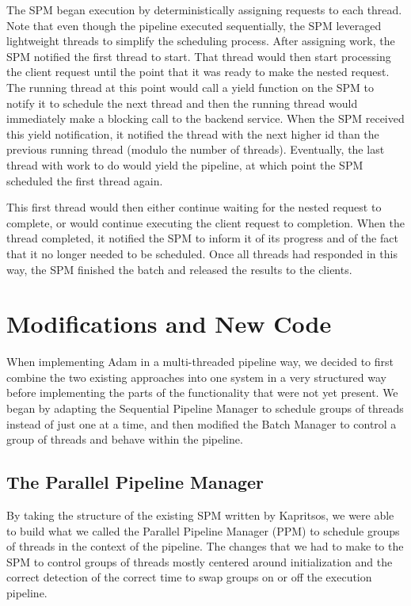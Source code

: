 \documentclass[11pt, oneside]{report}
\begin{document}
The SPM began execution by deterministically assigning requests to each thread. 
Note that even though the pipeline executed sequentially, the SPM leveraged lightweight threads to simplify the scheduling process. 
After assigning work, the SPM notified the first thread to start. 
That thread would then start processing the client request until the point that it was ready to make the nested request. 
The running thread at this point would call a yield function on the SPM to notify it to schedule the next thread and then the running thread would immediately make a blocking call to the backend service. 
When the SPM received this yield notification, it notified the thread with the next higher id than the previous running thread (modulo the number of threads). 
Eventually, the last thread with work to do would yield the pipeline, at which point the SPM scheduled the first thread again. 


This first thread would then either continue waiting for the nested request to complete, or would continue executing the client request to completion. 
When the thread completed, it notified the SPM to inform it of its progress and of the fact that it no longer needed to be scheduled. 
Once all threads had responded in this way, the SPM finished the batch and released the results to the clients.

\section{Modifications and New Code}

When implementing Adam in a multi-threaded pipeline way, we decided to first combine the two existing approaches into one system in a very structured way before implementing the parts of the functionality that were not yet present. 
We began by adapting the Sequential Pipeline Manager to schedule groups of threads instead of just one at a time, and then modified the Batch Manager to control a group of threads and behave within the pipeline.

\subsection{The Parallel Pipeline Manager}

By taking the structure of the existing SPM written by Kapritsos, we were able to build what we called the Parallel Pipeline Manager (PPM) to schedule groups of threads in the context of the pipeline. 
The changes that we had to make to the SPM to control groups of threads mostly centered around initialization and the correct detection of the correct time to swap groups on or off the execution pipeline.
\end{document}
